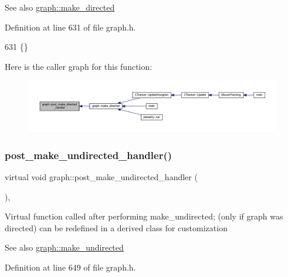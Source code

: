 \begin{DoxySeeAlso}{See also}
\mbox{\hyperlink{classgraph_a1615678dee6248d6d8a00c553770b3bd}{graph\+::make\+\_\+directed}} 
\end{DoxySeeAlso}


Definition at line 631 of file graph.\+h.


\begin{DoxyCode}
631 \{\}
\end{DoxyCode}
Here is the caller graph for this function\+:
\nopagebreak
\begin{figure}[H]
\begin{center}
\leavevmode
\includegraphics[width=350pt]{classgraph_a43dc35def3d8125eb8f3841d55e0b1c8_icgraph}
\end{center}
\end{figure}
\mbox{\label{classgraph_a3d2bc348d12931aff1d2e97a6b4285c3}} 
\subsubsection{\texorpdfstring{post\+\_\+make\+\_\+undirected\+\_\+handler()}{post\_make\_undirected\_handler()}}
{\footnotesize\ttfamily virtual void graph\+::post\+\_\+make\+\_\+undirected\+\_\+handler (\begin{DoxyParamCaption}{ }\end{DoxyParamCaption})\hspace{0.3cm}{\ttfamily [inline]}, {\ttfamily [virtual]}}

Virtual function called after performing make\+\_\+undirected; (only if graph was directed) can be redefined in a derived class for customization

\begin{DoxySeeAlso}{See also}
\mbox{\hyperlink{classgraph_a31c8b895bd842f1b9dcc67649956cfc7}{graph\+::make\+\_\+undirected}} 
\end{DoxySeeAlso}


Definition at line 649 of file graph.\+h.


